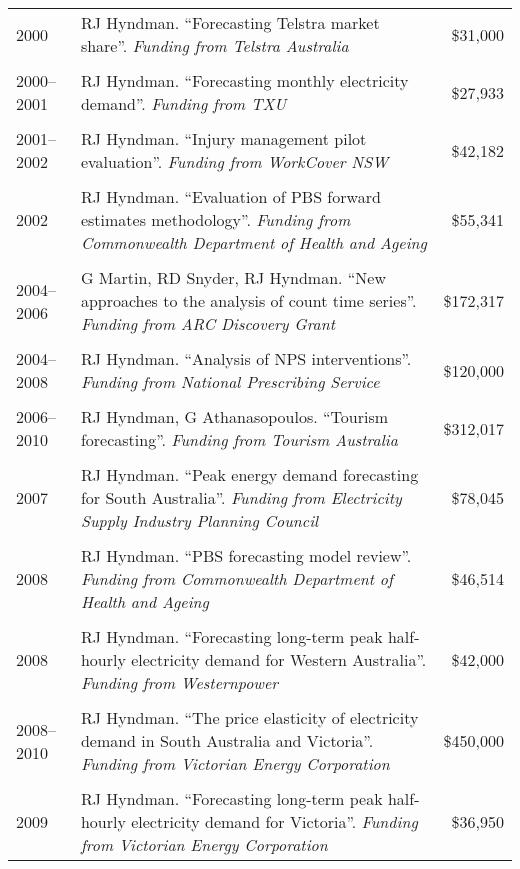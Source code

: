\documentclass[10pt,a4paper,]{article}
\begin{document}
\begingroup\fontsize{10}{16}
\begin{tabular}{lp{13.3cm}r}
   \hline
2000 & RJ Hyndman. ``Forecasting Telstra market share''. \emph{Funding from Telstra Australia} & \$31,000 \\ 
   \\[-0.2cm]2000--2001 & RJ Hyndman. ``Forecasting monthly electricity demand''. \emph{Funding from TXU} & \$27,933 \\ 
   \\[-0.2cm]2001--2002 & RJ Hyndman. ``Injury management pilot evaluation''. \emph{Funding from WorkCover NSW} & \$42,182 \\ 
   \\[-0.2cm]2002 & RJ Hyndman. ``Evaluation of PBS forward estimates methodology''. \emph{Funding from Commonwealth Department of Health and Ageing} & \$55,341 \\ 
   \\[-0.2cm]2004--2006 & G Martin, RD Snyder, RJ Hyndman. ``New approaches to the analysis of count time series''. \emph{Funding from ARC Discovery Grant} & \$172,317 \\ 
   \\[-0.2cm]2004--2008 & RJ Hyndman. ``Analysis of NPS interventions''. \emph{Funding from National Prescribing Service} & \$120,000 \\ 
   \\[-0.2cm]2006--2010 & RJ Hyndman, G Athanasopoulos. ``Tourism forecasting''. \emph{Funding from Tourism Australia} & \$312,017 \\ 
   \\[-0.2cm]2007 & RJ Hyndman. ``Peak energy demand forecasting for South Australia''. \emph{Funding from Electricity Supply Industry Planning Council} & \$78,045 \\ 
   \\[-0.2cm]2008 & RJ Hyndman. ``PBS forecasting model review''. \emph{Funding from Commonwealth Department of Health and Ageing} & \$46,514 \\ 
   \\[-0.2cm]2008 & RJ Hyndman. ``Forecasting long-term peak half-hourly electricity demand for Western Australia''. \emph{Funding from Westernpower} & \$42,000 \\ 
   \\[-0.2cm]2008--2010 & RJ Hyndman. ``The price elasticity of electricity demand in South Australia and Victoria''. \emph{Funding from Victorian Energy Corporation} & \$450,000 \\ 
   \\[-0.2cm]2009 & RJ Hyndman. ``Forecasting long-term peak half-hourly electricity demand for Victoria''. \emph{Funding from Victorian Energy Corporation} & \$36,950 \\ 

\end{tabular}
\end{document}
